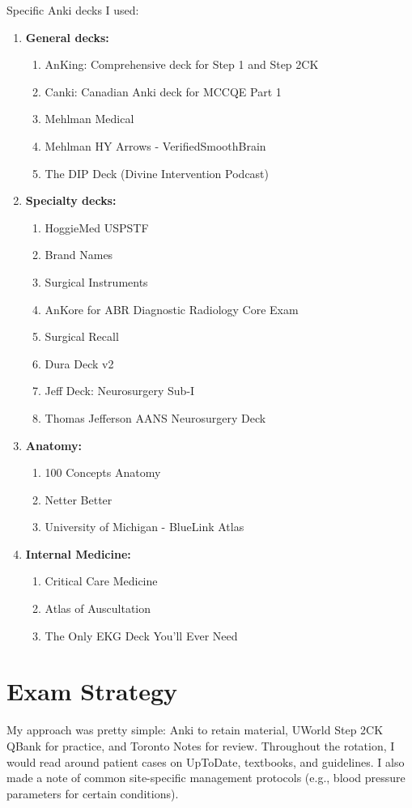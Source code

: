 \documentclass{article}
\begin{document}
Specific Anki decks I used:
\begin{multicols}{2}
\begin{enumerate}
    \item \textbf{General decks:}
    \begin{enumerate}
        \item AnKing: Comprehensive deck for Step 1 and Step 2CK
        \item Canki: Canadian Anki deck for MCCQE Part 1
        \item Mehlman Medical
        \item Mehlman HY Arrows - VerifiedSmoothBrain
        \item The DIP Deck (Divine Intervention Podcast)
    \end{enumerate}
    \item \textbf{Specialty decks:}
    \begin{enumerate}
        \item HoggieMed USPSTF
        \item Brand Names
        \item Surgical Instruments
        \item AnKore for ABR Diagnostic Radiology Core Exam
        \item Surgical Recall
        \item Dura Deck v2
        \item Jeff Deck: Neurosurgery Sub-I
        \item Thomas Jefferson AANS Neurosurgery Deck
    \end{enumerate}
    \item \textbf{Anatomy:}
    \begin{enumerate}
        \item 100 Concepts Anatomy
        \item Netter Better
        \item University of Michigan - BlueLink Atlas
    \end{enumerate}
    \item \textbf{Internal Medicine:}
    \begin{enumerate}
        \item Critical Care Medicine
        \item Atlas of Auscultation
        \item The Only EKG Deck You'll Ever Need
    \end{enumerate}
\end{enumerate}
\end{multicols}

\section*{Exam Strategy}
My approach was pretty simple: Anki to retain material, UWorld Step 2CK QBank for practice, and Toronto Notes for review. Throughout the rotation, I would read around patient cases on UpToDate, textbooks, and guidelines. I also made a note of common site-specific management protocols (e.g., blood pressure parameters for certain conditions).
\end{document}
